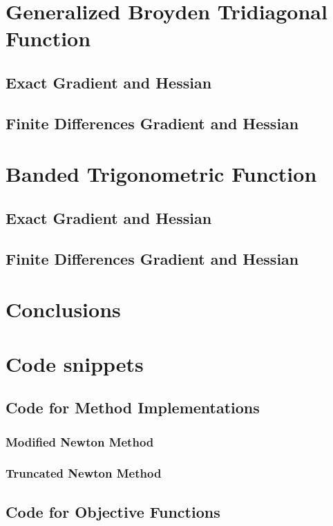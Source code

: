 \documentclass[a4paper,12pt]{article}
\begin{document}
	\section{Generalized Broyden Tridiagonal Function}
	\subsection{Exact Gradient and Hessian}
	\subsection{Finite Differences Gradient and Hessian}
	
	\section{Banded Trigonometric Function}
	\subsection{Exact Gradient and Hessian}
	\subsection{Finite Differences Gradient and Hessian}
	
	\section{Conclusions}
	
	\appendix              %
	\section{Code snippets}
	\subsection{Code for Method Implementations}
	\subsubsection{Modified Newton Method}
	\subsubsection{Truncated Newton Method}
	\subsection{Code for Objective Functions}
\end{document}
